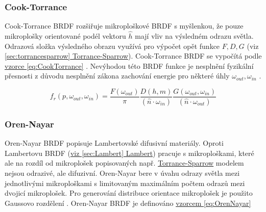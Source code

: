 \documentclass[czech,master,dept460,male,cpp,cpdeclaration]{diploma}
\newcommand{\uvec}[1]{\hat{#1}}
\begin{document}
\subsubsection{Cook-Torrance}
Cook-Torrance BRDF rozšiřuje mikroploškové BRDF s myšlenkou, že pouze mikroplošky orientované podél vektoru \(\uvec{h}\) mají vliv na výsledném odrazu světla. Odrazová složka výsledného obrazu využívá pro výpočet opět funkce \(F, D, G\) (viz \hyperref[sec:torrancesparrow]{\ref{sec:torrancesparrow} Torrance-Sparrow}). Cook-Torrance BRDF se vypočítá podle \hyperref[eq:CookTorrance]{vzorce \ref{eq:CookTorrance}} \cite{CookTorranceBRDF}. Nevýhodou této BRDF funkce je nesplnění fyzikální přesnosti z důvodu nesplnění zákona zachování energie pro některé úhly \(\omega_{out},\omega_{in}\) \cite{BRDFOverview}.

\begin{equation} \label{eq:CookTorrance}
    f_r\left(p,\omega_{out},\omega_{in}\right)  = \frac{F(\omega_{out})}{\pi} \frac{D(h,m)}{(\uvec{n}\cdot\omega_{in})} \frac{G(\omega_{out},\omega_{in})}{(\uvec{n}\cdot\omega_{out})}
\end{equation}

\subsubsection{Oren-Nayar}
Oren-Nayar BRDF popisuje Lambertovské difusivní materiály. Oproti Lambertovu BRDF (\hyperref[sec:Lambert]{viz \ref{sec:Lambert} Lambert}) pracuje s mikroploškami, které ale na rozdíl od mikroplošek popisovaných např. \hyperref[sec:torrancesparrow]{Torrance-Sparrow} modelem nejsou odrazivé, ale difuzivní. Oren-Nayar bere v úvahu odrazy světla mezi jednotlivými mikroploškami s limitovaným maximálním počtem odrazů mezi dvojicí mikroplošek. Pro generování distribuce orientace mikroplošek je použito Gaussovo rozdělení \cite{OrenNayar} \cite{BRDFOverview}. Oren-Nayar BRDF je definováno \hyperref[eq:OrenNayar]{vzorcem \ref{eq:OrenNayar}}

\newcommand{\cosphiri}{\cos\left(\phi_r-\phi_i\right)}
\end{document}

